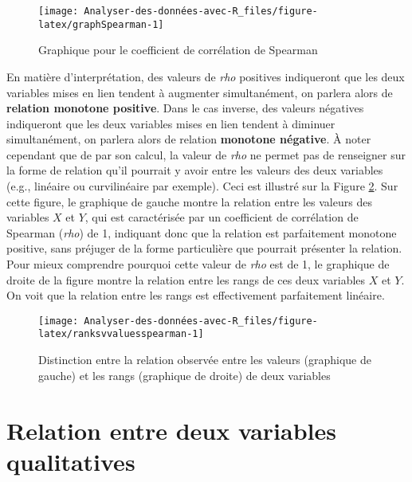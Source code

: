 \documentclass[
  french,
]{book}
\begin{document}
\begin{figure}

{\centering \texttt{[image: Analyser-des-données-avec-R\_files/figure-latex/graphSpearman-1]} 

}

\caption{Graphique pour le coefficient de corrélation de Spearman}\label{fig:graphSpearman}
\end{figure}

En matière d'interprétation, des valeurs de \emph{rho} positives indiqueront que les deux variables mises en lien tendent à augmenter simultanément, on parlera alors de \textbf{relation monotone positive}. Dans le cas inverse, des valeurs négatives indiqueront que les deux variables mises en lien tendent à diminuer simultanément, on parlera alors de relation \textbf{monotone négative}. À noter cependant que de par son calcul, la valeur de \emph{rho} ne permet pas de renseigner sur la forme de relation qu'il pourrait y avoir entre les valeurs des deux variables (e.g., linéaire ou curvilinéaire par exemple). Ceci est illustré sur la Figure \ref{fig:ranksvvaluesspearman}. Sur cette figure, le graphique de gauche montre la relation entre les valeurs des variables \(X\) et \(Y\), qui est caractérisée par un coefficient de corrélation de Spearman (\emph{rho}) de 1, indiquant donc que la relation est parfaitement monotone positive, sans préjuger de la forme particulière que pourrait présenter la relation. Pour mieux comprendre pourquoi cette valeur de \emph{rho} est de 1, le graphique de droite de la figure montre la relation entre les rangs de ces deux variables \(X\) et \(Y\). On voit que la relation entre les rangs est effectivement parfaitement linéaire.

\begin{figure}

{\centering \texttt{[image: Analyser-des-données-avec-R\_files/figure-latex/ranksvvaluesspearman-1]} 

}

\caption{Distinction entre la relation observée entre les valeurs (graphique de gauche) et les rangs (graphique de droite) de deux variables}\label{fig:ranksvvaluesspearman}
\end{figure}

\hypertarget{relation-entre-deux-variables-qualitatives}{%
\section{Relation entre deux variables qualitatives}\label{relation-entre-deux-variables-qualitatives}}
\end{document}
